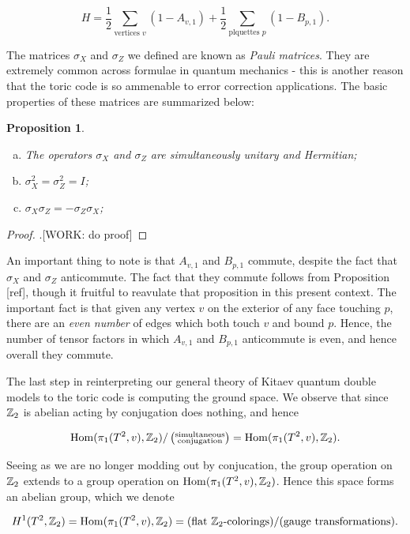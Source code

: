 \documentclass{article}
\newtheorem{proposition}{Proposition}[section]
\theoremstyle{definition}
\numberwithin{figure}{section}
\begin{document}
$$H=\frac{1}{2}\sum_{\text{vertices }v}(1-A_{v,1})+\frac{1}{2}\sum_{\text{plquettes }p}(1-B_{p,1}).$$

The matrices $\sigma_X$ and $\sigma_Z$ we defined are known as \textit{Pauli matrices}. They are extremely common across formulae in quantum mechanics - this is another reason that the toric code is so ammenable to error correction applications. The basic properties of these matrices are summarized below:

\begin{proposition}$\,$
\begin{enumerate}[(a)]
\item The operators $\sigma_X$ and $\sigma_Z$ are simultaneously unitary and Hermitian;
\item $\sigma_X^2=\sigma_Z^2=I$;
\item $\sigma_X \sigma_Z = - \sigma_Z \sigma_X$;
\end{enumerate}
\end{proposition}
\begin{proof}.[WORK: do proof]
\end{proof}

An important thing to note is that $A_{v,1}$ and $B_{p,1}$ commute, despite the fact that $\sigma_X$ and $\sigma_Z$ anticommute. The fact that they commute follows from Proposition [ref], though it fruitful to reavulate that proposition in this present context. The important fact is that given any vertex $v$ on the exterior of any face touching $p$,  there are an \textit{even number} of edges which both touch $v$ and bound $p$. Hence, the number of tensor factors in which $A_{v,1}$ and $B_{p,1}$ anticommute is even, and hence overall they commute.

The last step in reinterpreting our general theory of Kitaev quantum double models to the toric code is computing the ground space. We observe that since $\mathbb{Z}_2$ is abelian acting by conjugation does nothing, and hence

$$\mathrm{Hom}(\pi_1(T^2,v), \mathbb{Z}_2)/\left(\substack{\text{simultaneous} \\ \text{conjugation}}\right)=\mathrm{Hom}(\pi_1(T^2,v), \mathbb{Z}_2).$$

Seeing as we are no longer modding out by conjucation, the group operation on $\mathbb{Z}_2$ extends to a group operation on $\mathrm{Hom}(\pi_1(T^2,v), \mathbb{Z}_2)$. Hence this space forms an abelian group, which we denote

$$H^1(T^2,\mathbb{Z}_2)=\mathrm{Hom}(\pi_1(T^2,v), \mathbb{Z}_2)=(\text{flat $\mathbb{Z}_2$-colorings})/(\text{gauge transformations}).$$
\end{document}
